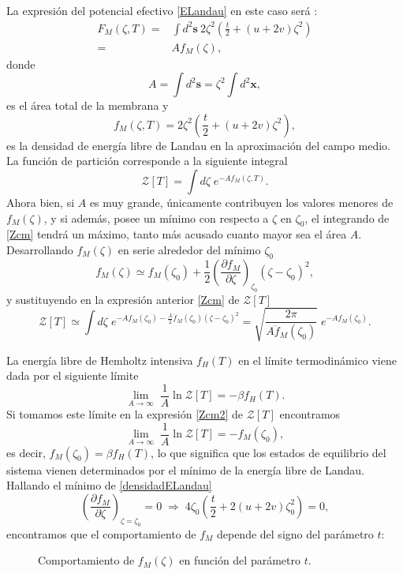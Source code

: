 La expresión del potencial efectivo \eqref{ELandau} en este caso será \cite{Bowick:Libro_superficies}:
\begin{align}
  F_M(\zeta,T)=&\int\! d^2 \mathbf{s}\ 2\zeta^2\!\left( \frac{t}{2} + (u+2v)\zeta^2\right)\\
  =&Af_M(\zeta),
\end{align}
donde 
$$A=\int d^2 \mathbf{s}=\zeta^2\int d^2 \mathbf{x} ,$$
es el área total de la membrana y 
\begin{equation}\label{densidadELandau}
f_M(\zeta,T)=2\zeta^2\!\left( \frac{t}{2} + (u+2v)\zeta^2\right),
\end{equation}
es la densidad de energía libre de Landau en la aproximación del campo medio. 
La función de partición corresponde a la siguiente integral
\begin{equation}\label{Zcm}
 \mathcal{Z}[T]=\int d\zeta\;e^{-Af_M(\zeta,T)}.
\end{equation}
Ahora bien, si $A$ es muy grande, únicamente contribuyen los valores menores de
$f_M(\zeta)$, y si además, posee un mínimo con respecto a $\zeta$ en
$\zeta_0$, el integrando de \eqref{Zcm} tendrá un máximo,
tanto más acusado cuanto mayor sea el área $A$. Desarrollando $f_M(\zeta)$ en
serie alrededor del mínimo $\zeta_0$
\begin{equation*}
f_M(\zeta)\simeq f_M(\zeta_0)+\frac{1}{2}\left(\frac{\partial f_M}{\partial \zeta}\right)_{\!\zeta_0}(\zeta-\zeta_0)^2,
\end{equation*}
y sustituyendo en la expresión anterior \eqref{Zcm} de $\mathcal{Z}[T]$ 
\begin{equation}\label{Zcm2}
 \mathcal{Z}[T]\simeq\int
 d\zeta\;e^{-Af_M(\zeta_0)-\frac{A}{2}\ddot{f}_M(\zeta_0)(\zeta-\zeta_0)^2}=
 \sqrt{\frac{2\pi}{A\ddot{f}_M(\zeta_0)}}\; e^{-Af_M(\zeta_0)}.
\end{equation}

La energía libre de Hemholtz intensiva $f_H(T)$ en el límite termodinámico
viene dada por el siguiente límite
\begin{equation*}
\lim_{A\rightarrow \infty}\; \frac{1}{A} \ln \mathcal{Z}[T]=-\beta f_H(T).
\end{equation*}
Si tomamos este límite en la expresión \eqref{Zcm2} de $\mathcal{Z}[T]$
encontramos
\begin{equation*}
\lim_{A\rightarrow \infty}\; \frac{1}{A} \ln \mathcal{Z}[T]=-f_M(\zeta_0),
\end{equation*}
es decir, $f_M(\zeta_0)=\beta f_H(T)$, lo que significa que los estados de
equilibrio del sistema vienen determinados por el mínimo de la energía libre
de Landau. Hallando el mínimo de \eqref{densidadELandau} 
\begin{equation*}
\left(\frac{\partial f_M}{\partial \zeta}\right)_{\!\zeta=\zeta_0}\!=0 \;
\Rightarrow \; 4\zeta_0\left(\frac{t}{2}+2(u+2v)\zeta_0^2\right)=0,
\end{equation*}
encontramos que el comportamiento de $f_M$ depende del signo del parámetro $t$:
\begin{figure}[h]
\centering
 \resizebox{\columnwidth}{!}{}
\caption{Comportamiento de $f_M(\zeta)$ en función del parámetro $t$.}
\end{figure} 

